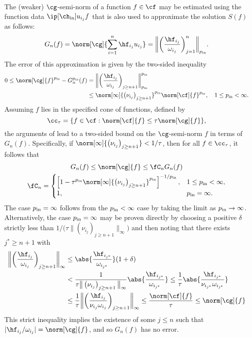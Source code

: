 \documentclass[final]{elsarticle}
\newcommand{\chin}{\ch_{\text{\rm{in}}}}
\newcommand{\pin}{p_{\text{\rm{in}}}}
\theoremstyle{definition}
\theoremstyle{remark}
\begin{document}
The (weaker) $\cg$-semi-norm of a function $f \in \cf$ may be estimated using the function data $\ip[\chin]{u_{i_j}}{f}$ that is also used to approximate the solution $S(f)$ as follows:
\begin{equation} \label{genLGalg}
G_n(f) = \norm[\cg]{\sum_{i=1}^n \hf_{i_j} u_{i_j} } = \bigg\lVert\bigg(\frac{\hf_{i_j}}{\omega_{i_j}}\bigg)_{j=1}^n\bigg\rVert_{\pin}.
\end{equation}
The error of this approximation is given by the two-sided inequality
\begin{align*}
0 \le \norm[\cg]{f}^{\pin} - G_n^{\pin}(f)
&= \bigg\lVert\bigg(\frac{\hf_{i_j}}{\omega_{i_j}}\bigg)_{j\ge n+1}\bigg\rVert_{\pin}^{\pin} \\
& \le \norm[\infty]{\left(\nu_{i_j} \right)_{j\ge n+1}}^{\pin} \norm[\cf]{f}^{\pin}, \quad 1 \le \pin <  \infty.
\end{align*}
Assuming $f$ lies in the specified cone of functions, defined by
\begin{equation} \label{FGconedef}
\cc_{\tau} = \{f \in \cf : \norm[\cf]{f} \le \tau \norm[\cg]{f} \},
\end{equation}
the arguments of \cite{HicEtal14b} lead to a two-sided bound on the $\cg$-semi-norm $f$ in terms of $G_n(f)$.  Specifically, if $\norm[\infty]{\left(\nu_{i_j} \right)_{j\ge n+1}} < 1/\tau$, then for all $f \in \cc_{\tau}$,  it follows that
\begin{gather*}
G_n(f)  \le \norm[\cg]{f} \le \fC_n G_n(f)\\
\fC_n=\begin{cases}\displaystyle \left[1 - \tau^{\pin} \norm[\infty]{\left(\nu_{i_j} \right)_{j\ge n+1}}^{\pin}\right]^{-1/\pin}, & 1 \le \pin <  \infty, \\
1, & \pin =  \infty.
\end{cases}
\end{gather*}
The case $\pin=\infty$ follows from the $\pin < \infty$ case by taking the limit as $\pin \to \infty$.  Alternatively, the case $\pin=\infty$ may be proven directly by choosing a positive $\delta$ strictly less than $1/\big(\tau \big\lVert\left(\nu_{i_j} \right)_{j\ge n+1}\big\rVert_{\infty}\big)$ and then noting that there exists $j^* \ge n+1$ with
\begin{align*}
\bigg\lVert\bigg(\frac{\hf_{i_j}}{\omega_{i_j}}\bigg)_{j\ge n+1}\bigg\rVert_{\infty}
& \le  \abs{\frac{\hf_{i_{j^*}}}{\omega_{i_{j^*}}}} (1+\delta) \\
& < \frac{1}{\tau \big\lVert\left(\nu_{i_j} \right)_{j\ge n+1}\big\rVert_{\infty}}  \abs{\frac{\hf_{i_{j^*}}}{\omega_{i_{j^*}}}}
\le \frac{1}{\tau } \abs{\frac{\hf_{i_{j^*}}}{\nu_{i_{j^*}} \omega_{i_{j^*}}}}\\
& \le \frac{1}{\tau }\bigg\lVert\bigg(\frac{\hf_{i_j}}{\nu_{i_j}\omega_{i_j}}\bigg)_{j\ge n+1}\bigg\rVert_{\infty} \le \frac{\norm[\cf]{f}}{\tau} \le \norm[\cg]{f}
\end{align*}
This strict inequality implies the existence of some $j \le n$ such that $\lvert\hf_{i_j}/\omega_{i_j} \rvert = \norm[\cg]{f}$, and so $G_n(f)$ has no error.
\end{document}
